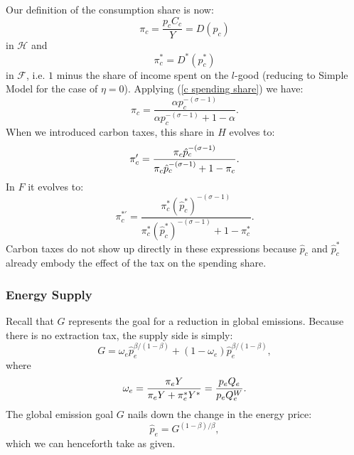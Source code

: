 \documentclass[notitlepage,12pt]{article}
\begin{document}
Our definition of the consumption share is now:%
\begin{equation*}
\pi _{c}=\frac{p_{c}C_{c}}{Y}=D(p_{c})
\end{equation*}%
in $\mathcal{H}$ and 
\begin{equation*}
\pi _{c}^{\ast }=D^{\ast }(p_{c}^{\ast })
\end{equation*}%
in $\mathcal{F}$, i.e. $1$ minus the share of income spent on the $l$-good
(reducing to Simple Model for the case of $\eta =0$). Applying (\ref{c
spending share}) we have:%
\begin{equation*}
\pi _{c}=\frac{\alpha p_{c}^{-\left( \sigma -1\right) }}{\alpha
p_{c}^{-(\sigma -1)}+1-\alpha }.
\end{equation*}%
When we introduced carbon taxes, this share in $H$ evolves to:%
\begin{equation}
\pi _{c}^{\prime }=\frac{\pi _{c}\hat{p}_{c}^{-\left( \sigma -1\right) }}{%
\pi _{c}\hat{p}_{c}^{-\left( \sigma -1\right) }+1-\pi _{c}}.
\label{c share prime}
\end{equation}%
In $F$ it evolves to:%
\begin{equation}
\pi _{c}^{\ast \prime }=\frac{\pi _{c}^{\ast }\left( \hat{p}_{c}^{\ast
}\right) ^{-\left( \sigma -1\right) }}{\pi _{c}^{\ast }\left( \hat{p}%
_{c}^{\ast }\right) ^{-\left( \sigma -1\right) }+1-\pi _{c}^{\ast }}.
\label{c share star prime}
\end{equation}%
Carbon taxes do not show up directly in these expressions because $\hat{p}%
_{c}$ and $\hat{p}_{c}^{\ast }$ already embody the effect of the tax on the
spending share.

\subsubsection{Energy Supply}

Recall that $G$ represents the goal for a reduction in global emissions.
Because there is no extraction tax, the supply side is simply:%
\begin{equation}
G=\omega _{e}\hat{p}_{e}^{\beta /(1-\beta )}+\left( 1-\omega _{e}\right) 
\hat{p}_{e}^{\beta /(1-\beta )},  \label{supply change partial btas}
\end{equation}%
where%
\begin{equation*}
\omega _{e}=\frac{\pi _{e}Y}{\pi _{e}Y+\pi _{e}^{\ast }Y^{\ast }}=\frac{%
p_{e}Q_{e}}{p_{e}Q_{e}^{W}}.
\end{equation*}%
The global emission goal $G$ nails down the change in the energy price:%
\begin{equation}
\hat{p}_{e}=G^{\left( 1-\beta \right) /\beta },  \label{phat energy of G}
\end{equation}%
which we can henceforth take as given.
\end{document}
